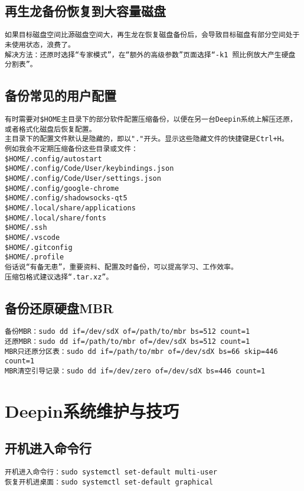 \documentclass[a4paper,fontset=fandol,zihao=-4,linespread=1.2,oneside]{ctexbook}
\begin{document}
\section{再生龙备份恢复到大容量磁盘}
\begin{lstlisting}
如果目标磁盘空间比源磁盘空间大，再生龙在恢复磁盘备份后，会导致目标磁盘有部分空间处于未使用状态，浪费了。
解决方法：还原时选择“专家模式”，在“额外的高级参数”页面选择“-k1 照比例放大产生硬盘分割表”。
\end{lstlisting}

\section{备份常见的用户配置}
\begin{lstlisting}
有时需要对$HOME主目录下的部分软件配置压缩备份，以便在另一台Deepin系统上解压还原，或者格式化磁盘后恢复配置。
主目录下的配置文件默认是隐藏的，即以"."开头。显示这些隐藏文件的快捷键是Ctrl+H。
例如我会不定期压缩备份这些目录或文件：
$HOME/.config/autostart
$HOME/.config/Code/User/keybindings.json
$HOME/.config/Code/User/settings.json
$HOME/.config/google-chrome
$HOME/.config/shadowsocks-qt5
$HOME/.local/share/applications
$HOME/.local/share/fonts
$HOME/.ssh
$HOME/.vscode
$HOME/.gitconfig
$HOME/.profile
俗话说“有备无患”，重要资料、配置及时备份，可以提高学习、工作效率。
压缩包格式建议选择“.tar.xz”。
\end{lstlisting}

\section{备份还原硬盘MBR}
\begin{lstlisting}
备份MBR：sudo dd if=/dev/sdX of=/path/to/mbr bs=512 count=1
还原MBR：sudo dd if=/path/to/mbr of=/dev/sdX bs=512 count=1
MBR只还原分区表：sudo dd if=/path/to/mbr of=/dev/sdX bs=66 skip=446 count=1
MBR清空引导记录：sudo dd if=/dev/zero of=/dev/sdX bs=446 count=1
\end{lstlisting}


\chapter{Deepin系统维护与技巧}

\section{开机进入命令行}
\begin{lstlisting}
开机进入命令行：sudo systemctl set-default multi-user
恢复开机进桌面：sudo systemctl set-default graphical
\end{lstlisting}
\end{document}
